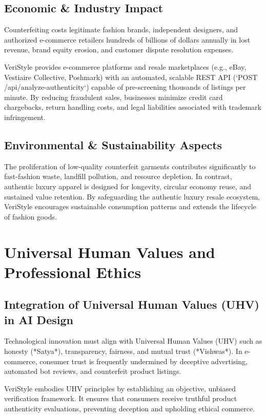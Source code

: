 \documentclass[a4paper,12pt]{report}
\begin{document}
\section{Economic \& Industry Impact}
Counterfeiting costs legitimate fashion brands, independent designers, and authorized e-commerce retailers hundreds of billions of dollars annually in lost revenue, brand equity erosion, and customer dispute resolution expenses. 

VeriStyle provides e-commerce platforms and resale marketplaces (e.g., eBay, Vestiaire Collective, Poshmark) with an automated, scalable REST API (`POST /api/analyze-authenticity`) capable of pre-screening thousands of listings per minute. By reducing fraudulent sales, businesses minimize credit card chargebacks, return handling costs, and legal liabilities associated with trademark infringement.

\section{Environmental \& Sustainability Aspects}
The proliferation of low-quality counterfeit garments contributes significantly to fast-fashion waste, landfill pollution, and resource depletion. In contrast, authentic luxury apparel is designed for longevity, circular economy reuse, and sustained value retention. By safeguarding the authentic luxury resale ecosystem, VeriStyle encourages sustainable consumption patterns and extends the lifecycle of fashion goods.

\newpage

\chapter{Universal Human Values and Professional Ethics}

\section{Integration of Universal Human Values (UHV) in AI Design}
Technological innovation must align with Universal Human Values (UHV) such as honesty (*Satya*), transparency, fairness, and mutual trust (*Vishwas*). In e-commerce, consumer trust is frequently undermined by deceptive advertising, automated bot reviews, and counterfeit product listings.

VeriStyle embodies UHV principles by establishing an objective, unbiased verification framework. It ensures that consumers receive truthful product authenticity evaluations, preventing deception and upholding ethical commerce.
\end{document}
